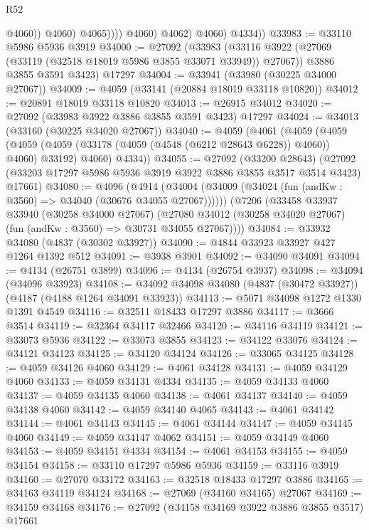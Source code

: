 \begin{lexlean}{R52}
\begin{coremodule}
                            @4060))
                        @4060)
                      @4065))))
              @4060)
            @4062)
          @4060)
        @4334))
@33983 := @33110 @5986 @5936 @3919
@34000 := @27092
    (@33983
      (@33116 @3922 (@27069 (@33119 (@32518 @18019 @5986 @3855 @33071 @33949)) @27067))
      @3886
      @3855
      @3591
      @3423)
    @17297
@34004 := @33941 (@33980 (@30225 @34000 @27067))
@34009 := @4059 (@33141 (@20884 @18019 @33118 @10820))
@34012 := @20891 @18019 @33118 @10820
@34013 := @26915 @34012
@34020 := @27092 (@33983 @3922 @3886 @3855 @3591 @3423) @17297
@34024 := @34013 (@33160 (@30225 @34020 @27067))
@34040 := @4059
    (@4061
      (@4059
        (@4059
          (@4059 (@4059 (@33178 (@4059 (@4548 (@6212 @28643 @6228)) @4060)) @4060) @33192)
          @4060)
        @4334))
@34055 := @27092
    (@33200 @28643)
    (@27092 (@33203 @17297 @5986 @5936 @3919 @3922 @3886 @3855 @3517 @3514 @3423) @17661)
@34080 := @4096
    (@4914 (@34004 (@34009 (@34024 (fun (andKw : @3560) => @34040 (@30676 @34055 @27067))))))
    (@7206
      (@33458
        @33937
        @33940
        (@30258 @34000 @27067)
        (@27080 @34012 (@30258 @34020 @27067) (fun (andKw : @3560) => @30731 @34055 @27067))))
@34084 := @33932 @34080 (@4837 (@30302 @33927))
@34090 := @4844 @33923 @33927 @427 @1264 @1392 @512
@34091 := @3938 @3901
@34092 := @34090 @34091
@34094 := @4134 (@26751 @3899)
@34096 := @4134 (@26754 @3937)
@34098 := @34094 (@34096 @33923)
@34108 := @34092 @34098 @34080 (@4837 (@30472 @33927)) (@4187 (@4188 @1264 @34091 @33923))
@34113 := @5071 @34098 @1272 @1330 @1391 @4549
@34116 := @32511 @18433 @17297 @3886
@34117 := @3666 @3514
@34119 := @32364 @34117 @32466
@34120 := @34116 @34119
@34121 := @33073 @5936
@34122 := @33073 @3855
@34123 := @34122 @33076
@34124 := @34121 @34123
@34125 := @34120 @34124
@34126 := @33065 @34125
@34128 := @4059 @34126 @4060
@34129 := @4061 @34128
@34131 := @4059 @34129 @4060
@34133 := @4059 @34131 @4334
@34135 := @4059 @34133 @4060
@34137 := @4059 @34135 @4060
@34138 := @4061 @34137
@34140 := @4059 @34138 @4060
@34142 := @4059 @34140 @4065
@34143 := @4061 @34142
@34144 := @4061 @34143
@34145 := @4061 @34144
@34147 := @4059 @34145 @4060
@34149 := @4059 @34147 @4062
@34151 := @4059 @34149 @4060
@34153 := @4059 @34151 @4334
@34154 := @4061 @34153
@34155 := @4059 @34154
@34158 := @33110 @17297 @5986 @5936
@34159 := @33116 @3919
@34160 := @27070 @33172
@34163 := @32518 @18433 @17297 @3886
@34165 := @34163 @34119 @34124
@34168 := @27069 (@34160 @34165) @27067
@34169 := @34159 @34168
@34176 := @27092 (@34158 @34169 @3922 @3886 @3855 @3517) @17661

\end{coremodule}
\end{lexlean}
